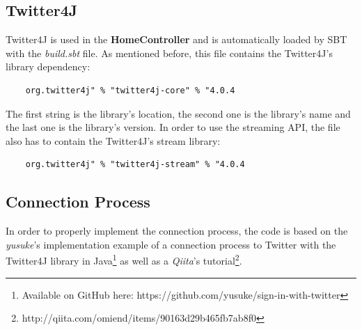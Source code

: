 \documentclass[a4paper,11pt]{report}
\begin{document}
\subsection{Twitter4J}
Twitter4J is used in the \textbf{HomeController} and is automatically loaded by SBT with the \emph{build.sbt} file. As mentioned before, this file contains the Twitter4J's library dependency:
\begin{lstlisting}
	org.twitter4j" % "twitter4j-core" % "4.0.4
\end{lstlisting}
The first string is the library's location, the second one is the library's name and the last one is the library's version. In order to use the streaming API, the file also has to contain the Twitter4J's stream library:
\begin{lstlisting}
	org.twitter4j" % "twitter4j-stream" % "4.0.4
\end{lstlisting}

\subsection{Connection Process}
In order to properly implement the connection process, the code is based on the \emph{yusuke}'s implementation example of a connection process to Twitter with the Twitter4J library in Java\footnote{Available on GitHub here: https://github.com/yusuke/sign-in-with-twitter} as well as a \emph{Qiita}'s tutorial\footnote{http://qiita.com/omiend/items/90163d29b465fb7ab8f0}.\\
\end{document}
